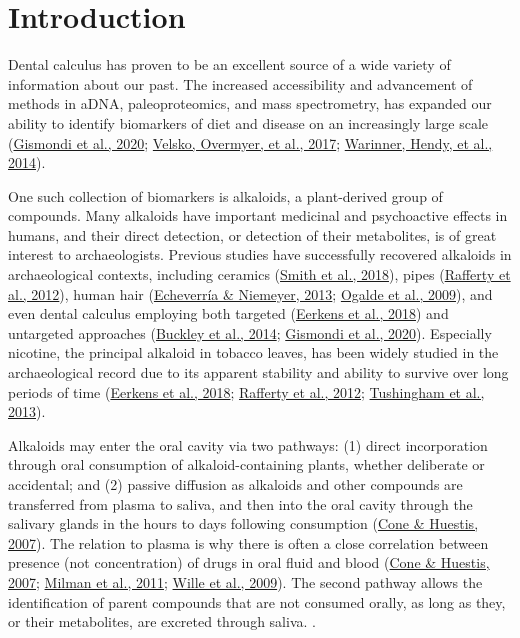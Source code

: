 \documentclass[
  letterpaper,
]{book}
\begin{document}
\hypertarget{mb11CalculusPilot}{%
\section{Introduction}\label{mb11CalculusPilot}}

Dental calculus has proven to be an excellent source of a wide variety
of information about our past. The increased accessibility and
advancement of methods in aDNA, paleoproteomics, and mass spectrometry,
has expanded our ability to identify biomarkers of diet and disease on
an increasingly large scale
(\protect\hyperlink{ref-gismondiMultidisciplinaryApproach2020}{Gismondi
et al., 2020}; \protect\hyperlink{ref-velskoDentalCalculus2017}{Velsko,
Overmyer, et al., 2017};
\protect\hyperlink{ref-warinnerEvidenceMilk2014}{Warinner, Hendy, et
al., 2014}).

One such collection of biomarkers is alkaloids, a plant-derived group of
compounds. Many alkaloids have important medicinal and psychoactive
effects in humans, and their direct detection, or detection of their
metabolites, is of great interest to archaeologists. Previous studies
have successfully recovered alkaloids in archaeological contexts,
including ceramics
(\protect\hyperlink{ref-smithDetectionOpium2018}{Smith et al., 2018}),
pipes (\protect\hyperlink{ref-raffertyCurrentResearch2012}{Rafferty et
al., 2012}), human hair
(\protect\hyperlink{ref-echeverriaNicotineHair2013}{Echeverría \&
Niemeyer, 2013};
\protect\hyperlink{ref-ogaldeIdentificationPsychoactive2009}{Ogalde et
al., 2009}), and even dental calculus employing both targeted
(\protect\hyperlink{ref-eerkensDentalCalculus2018}{Eerkens et al.,
2018}) and untargeted approaches
(\protect\hyperlink{ref-buckleyDentalCalculus2014}{Buckley et al.,
2014};
\protect\hyperlink{ref-gismondiMultidisciplinaryApproach2020}{Gismondi
et al., 2020}). Especially nicotine, the principal alkaloid in tobacco
leaves, has been widely studied in the archaeological record due to its
apparent stability and ability to survive over long periods of time
(\protect\hyperlink{ref-eerkensDentalCalculus2018}{Eerkens et al.,
2018}; \protect\hyperlink{ref-raffertyCurrentResearch2012}{Rafferty et
al., 2012};
\protect\hyperlink{ref-tushinghamHuntergathererTobacco2013}{Tushingham
et al., 2013}).

Alkaloids may enter the oral cavity via two pathways: (1) direct
incorporation through oral consumption of alkaloid-containing plants,
whether deliberate or accidental; and (2) passive diffusion as alkaloids
and other compounds are transferred from plasma to saliva, and then into
the oral cavity through the salivary glands in the hours to days
following consumption
(\protect\hyperlink{ref-coneInterpretationOral2007}{Cone \& Huestis,
2007}). The relation to plasma is why there is often a close correlation
between presence (not concentration) of drugs in oral fluid and blood
(\protect\hyperlink{ref-coneInterpretationOral2007}{Cone \& Huestis,
2007}; \protect\hyperlink{ref-milmanOralFluid2011}{Milman et al., 2011};
\protect\hyperlink{ref-willeRelationshipOral2009}{Wille et al., 2009}).
The second pathway allows the identification of parent compounds that
are not consumed orally, as long as they, or their metabolites, are
excreted through saliva. .
\end{document}
